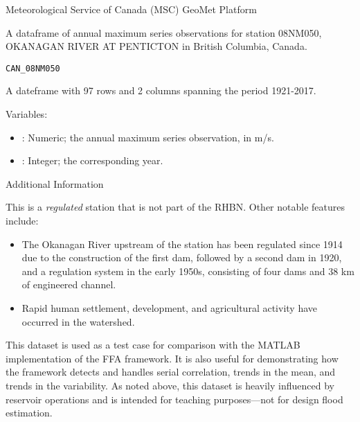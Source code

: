 \documentclass[a4paper]{book}
\begin{document}
%
\begin{Source}
Meteorological Service of Canada (MSC) GeoMet Platform
\end{Source}
%
\begin{Description}
A dataframe of annual maximum series observations for
station 08NM050, OKANAGAN RIVER AT PENTICTON in British Columbia, Canada.
\end{Description}
%
\begin{Usage}
\begin{verbatim}
CAN_08NM050
\end{verbatim}
\end{Usage}
%
\begin{Format}
A dateframe with 97 rows and 2 columns spanning the period 1921-2017.
\end{Format}
%
\begin{Details}
Variables:
\begin{itemize}

\item{} : Numeric; the annual maximum series observation, in m/s.
\item{} : Integer; the corresponding year.

\end{itemize}

\end{Details}
%
\begin{Section}{Additional Information}

This is a \emph{regulated} station that is not part of the RHBN. Other notable features include:
\begin{itemize}

\item{} The Okanagan River upstream of the station has been regulated since 1914 due to the
construction of the first dam, followed by a second dam in 1920, and a regulation system
in the early 1950s, consisting of four dams and 38 km of engineered channel.
\item{} Rapid human settlement, development, and agricultural activity have occurred in the watershed.

\end{itemize}


This dataset is used as a test case for comparison with the MATLAB implementation of the
FFA framework. It is also useful for demonstrating how the framework detects and handles
serial correlation, trends in the mean, and trends in the variability. As noted above,
this dataset is heavily influenced by reservoir operations and is intended for teaching
purposes—not for design flood estimation.
\end{Section}
\end{document}
